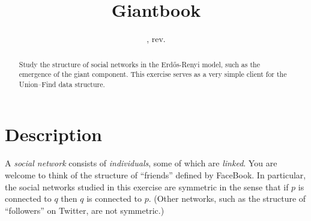 \documentclass{tufte-handout}
\title{Giantbook}
\author{}
\date{\GITAuthorDate, rev. \GITAbrHash}
\begin{document}
\maketitle

\begin{abstract}Study the structure of social networks in the
  Erd\H{o}s-Renyi model, such as the emergence of the giant component. 
  This exercise serves as a very simple client for
  the Union--Find data structure.
\end{abstract}

\section{Description}
A \emph{social network} consists of \emph{individuals}, some of which are \emph{linked}. 
You are welcome to think of the structure of ``friends'' defined by FaceBook.
In particular, the social networks studied in this exercise are
symmetric in the sense that if $p$ is connected to $q$ then $q$ is connected
to $p$.
(Other networks, such as the structure of ``followers'' on Twitter, are
not symmetric.)
\end{document}
